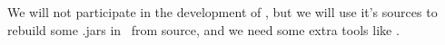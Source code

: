 \clearpage
{}\secdown

We will not participate in the development of \hgdb{}, but we will use it's sources to rebuild some .jars
in \seco\ from source, and we need some extra tools like \hgv. 



\secup